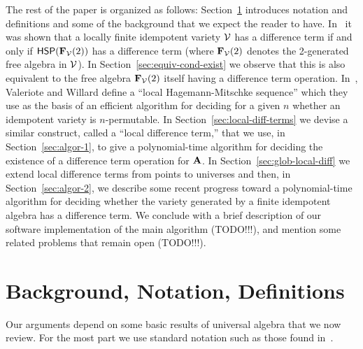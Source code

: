 The rest of the paper is organized as follows:
Section~\ref{sec:definitions} introduces notation and definitions and some of
the background that we expect the reader to have.
In~\cite{MR1358491} 
it was shown that a locally finite idempotent variety $\mathcal{V}$ has a difference
term if and only if $\mathsf{H} \mathsf{S} \mathsf{P}(\mathbf{F}_{\mathcal{V}}(2))$ 
has a difference term (where $\mathbf{F}_{\mathcal{V}}(2)$ denotes the 2-generated free algebra in $\mathcal{V}$).
In Section~\ref{sec:equiv-cond-exist}
we observe that this is also equivalent to
the free algebra $\mathbf{F}_{\mathcal{V}}(2)$ itself having a difference term operation.
In~\cite{MR3239624},
Valeriote and Willard define 
a ``local Hagemann-Mitschke sequence'' which they use as the basis of
an efficient algorithm for deciding for a given $n$ whether an idempotent
variety is $n$-permutable. 
In Section~\ref{sec:local-diff-terms}
we devise a similar construct, called
a ``local difference term,'' that we use, in Section~\ref{sec:algor-1},
to give a polynomial-time algorithm for deciding the existence of a difference term
operation for $\mathbf{A}$.  In Section~\ref{sec:glob-local-diff} we extend local
difference terms from points to universes and then, in 
Section~\ref{sec:algor-2}, we describe some recent progress toward a polynomial-time
algorithm for deciding whether the variety generated by a finite idempotent algebra has a
difference term. We conclude with a brief description of our software
implementation of the main algorithm (TODO!!!), and mention some related 
problems that remain open (TODO!!!).


\section{Background, Notation, Definitions}
\label{sec:definitions}
Our arguments depend on some basic results of universal algebra that we now review.
For the most part we use standard notation such as those found in~\cite{MR2839398}.

